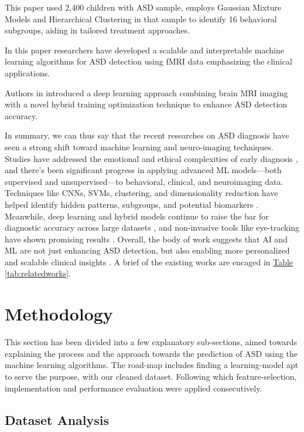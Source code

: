 \documentclass[pdflatex,sn-nature]{sn-jnl}
\theoremstyle{thmstyleone}%
\theoremstyle{thmstyletwo}%
\theoremstyle{thmstylethree}%
\begin{document}
This paper \cite{bib12} used 2,400 children with ASD sample, employs Gaussian Mixture Models and Hierarchical Clustering in that sample to identify 16 behavioral subgroups, aiding in tailored treatment approaches.

In this paper \cite{bib13} researchers have developed a  scalable and interpretable machine learning algorithms for ASD detection using fMRI data emphasizing the clinical applications.

Authors in \cite{bib14} introduced a deep learning approach combining brain MRI imaging with a novel hybrid training optimization technique to enhance ASD detection accuracy.

In summary, we can thus say that the recent researches on ASD diagnosis have seen a strong shift toward machine learning and neuro-imaging techniques. Studies have addressed the emotional and ethical complexities of early diagnosis \cite{parlett2023applications}, and there's been significant progress in applying advanced ML models—both supervised and unsupervised—to behavioral, clinical, and neuroimaging data. Techniques like CNNs, SVMs, clustering, and dimensionality reduction have helped identify hidden patterns, subgroups, and potential biomarkers \cite{nogay2020machine, parlett2023applications, bib5}. Meanwhile, deep learning and hybrid models continue to raise the bar for diagnostic accuracy across large datasets \cite{bib6, bib7, bib8}, and non-invasive tools like eye-tracking have shown promising results \cite{bib10}. Overall, the body of work suggests that AI and ML are not just enhancing ASD detection, but also enabling more personalized and scalable clinical insights \cite{bib12, bib13, bib14}. A brief of the existing works are encaged in \hyperref[tab:relatedworks]{Table \ref{tab:relatedworks}}.


\section{Methodology}\label{sec3}

This section has been divided into a few explanatory sub-sections, aimed towards explaining the process and the approach towards the prediction of ASD using the machine learning algorithms. The road-map includes finding a learning-model apt to serve the purpose, with our cleaned dataset. Following which feature-selection, implementation and performance evaluation were applied consecutively.

\subsection{Dataset Analysis}
\end{document}
